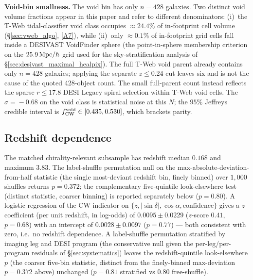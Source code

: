 \documentclass[twocolumn,linenumbers]{aastex702}
\newcommand{\repoBase}{https://github.com/Hubify-Projects/bigbounce/blob/main}
\begin{document}
\textbf{Void-bin smallness.} The void bin has only $n\!=\!428$
galaxies. Two distinct void volume fractions appear in this paper and refer to different denominators: (i)~the T-Web tidal-classifier void class occupies ${\approx}24.4\%$ of in-footprint cell volume (\S\ref{sec:vweb_algo}, \href{\repoBase/pipelines/p5\_desi\_chirality/env\_finder/reports/01\_volume\_fractions.json}{[A7]}), while (ii)~only ${\approx}0.1\%$ of in-footprint grid cells fall inside a DESIVAST VoidFinder sphere (the point-in-sphere membership criterion on the $25.9\,{\rm Mpc}/h$ grid used for the sky-stratification analysis of \S\ref{sec:desivast_maximal_healpix}). The full T-Web void parent already contains only $n\!=\!428$ galaxies; applying the separate $z\leq0.24$ cut leaves six and is not the cause of the quoted 428-object count. The small full-parent count instead reflects the sparse $r\leq17.8$ DESI Legacy spiral selection within T-Web void cells. The $\sigma\!=\!-0.68$ on the void
class is statistical noise at this $N$; the $95\%$ Jeffreys credible
interval is $f_{\rm CW}^{\rm void} \in [0.435, 0.530]$, which brackets
parity.

\subsection{Redshift dependence}\label{sec:results_z}

The matched chirality-relevant subsample has redshift median $0.168$
and maximum $3.83$. The label-shuffle permutation null on the
max-absolute-deviation-from-half statistic (the single most-deviant
redshift bin, finely binned) over $1{,}000$ shuffles returns
$p\!=\!0.372$; the complementary five-quintile look-elsewhere test
(distinct statistic, coarser binning) is reported separately below
($p = 0.80$).
A logistic regression of the CW indicator on $\{z, |\sin\delta|,
\cos\alpha, \text{confidence}\}$ gives a $z$-coefficient (per unit
redshift, in log-odds) of $0.0095 \pm 0.0229$ ($z$-score $0.41$,
$p = 0.68$) with an intercept of $0.0028 \pm 0.0097$ ($p = 0.77$) —
both consistent with zero, i.e.\ no
redshift dependence. A label-shuffle permutation stratified by
imaging leg and DESI program (the conservative null given the
per-leg/per-program residuals of \S\ref{sec:systematics}) leaves the
redshift-quintile look-elsewhere $p$ (the coarser five-bin statistic,
distinct from the finely-binned max-deviation $p = 0.372$ above)
unchanged ($p = 0.81$ stratified vs $0.80$ free-shuffle).
\end{document}
